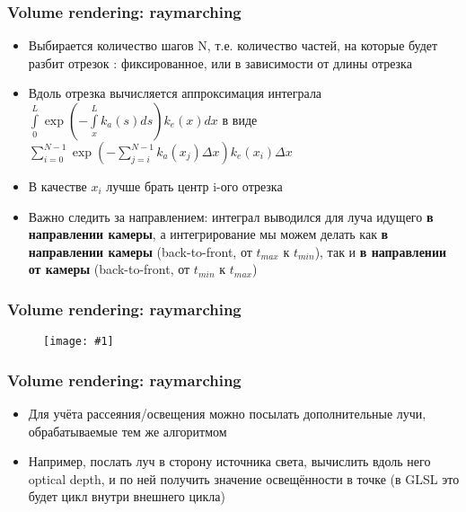 \documentclass{beamer}
\newcommand{\slideimage}[1]{
  \begin{figure}
    \begin{adjustbox}{width=\textwidth, totalheight=\textheight-2\baselineskip-2\baselineskip,keepaspectratio}
      \texttt{[image: \#1]}
    \end{adjustbox}
  \end{figure}
}
\begin{document}
\begin{frame}[fragile]
\frametitle{Volume rendering: raymarching}
\begin{itemize}
\item Выбирается количество шагов N, т.е. количество частей, на которые будет разбит отрезок \begin{math}[t_{min}, t_{max}]\end{math}: фиксированное, или в зависимости от длины отрезка
\pause
\item Вдоль отрезка вычисляется аппроксимация интеграла \begin{math}\int\limits_0^L \exp\left(-\int\limits_x^L k_a(s) ds\right) k_e(x) dx\end{math} в виде \begin{math}\sum\limits_{i=0}^{N-1} \exp\left(-\sum\limits_{j=i}^{N-1} k_a(x_j) \Delta x\right) k_e(x_i) \Delta x\end{math}
\pause
\item В качестве \begin{math}x_i\end{math} лучше брать центр i-ого отрезка
\pause
\item Важно следить за направлением: интеграл выводился для луча идущего \textbf{в направлении камеры}, а интегрирование мы можем делать как \textbf{в направлении камеры} (back-to-front, от \begin{math}t_{max}\end{math} к \begin{math}t_{min}\end{math}), так и \textbf{в направлении от камеры} (back-to-front, от \begin{math}t_{min}\end{math} к \begin{math}t_{max}\end{math})
\end{itemize}
\end{frame}

\begin{frame}[fragile]
\frametitle{Volume rendering: raymarching}
\slideimage{raymarching-1.png}
\end{frame}

\begin{frame}[fragile]
\frametitle{Volume rendering: raymarching}
\begin{itemize}
\item Для учёта рассеяния/освещения можно посылать дополнительные лучи, обрабатываемые тем же алгоритмом
\pause
\item Например, послать луч в сторону источника света, вычислить вдоль него optical depth, и по ней получить значение освещённости в точке (в GLSL это будет цикл внутри внешнего цикла)
\end{itemize}
\end{frame}
\end{document}
